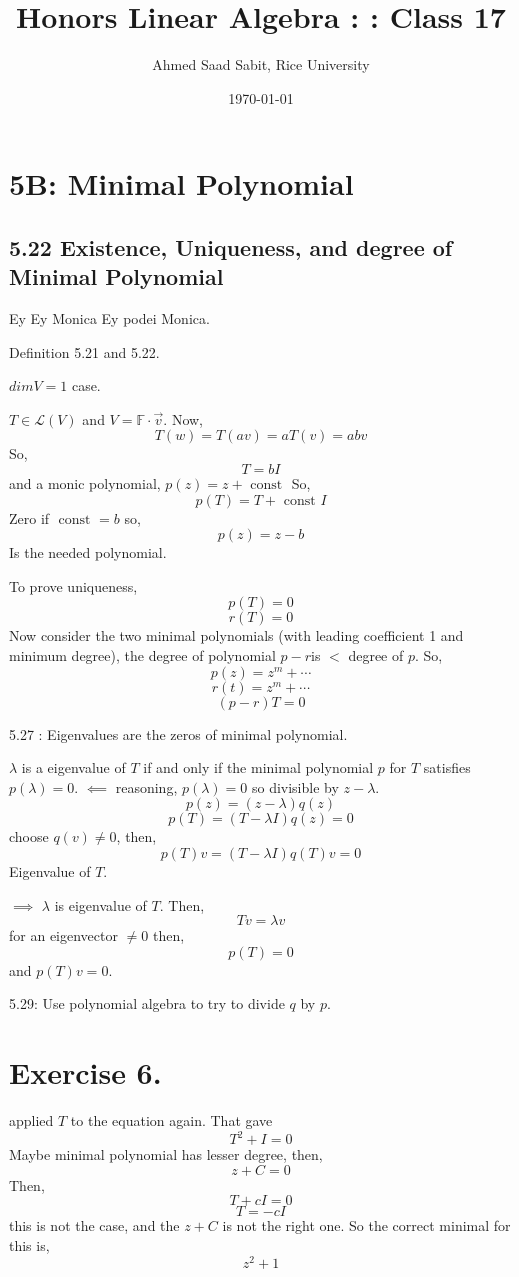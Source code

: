 \documentclass[letter]{article}
\title{Honors Linear Algebra : : Class 17}
\author{Ahmed Saad Sabit, Rice University}
\date{\today}
\begin{document}
\maketitle

\section*{5B: Minimal Polynomial} 
\subsection*{5.22 Existence, Uniqueness, and degree of Minimal Polynomial}

Ey Ey Monica 
Ey podei Monica. 

Definition 5.21 and 5.22. 

$dim V = 1$ case. 

$T \in  \mathcal L (V)$ and $V = \mathbb{F} \cdot \vec{v}$. Now,
\[
T(w ) = T(a v) = a T(v) = ab v
\]
So, 
\[
T = b I 
\]
and a monic polynomial, 
$p(z) = z+ \text{ const }$
So, 
\[
p(T) = T + \text{ const } I 
\]
Zero if $\text{ const } = b$
so, 
\[
p(z) = z - b
\] Is the needed polynomial. 

To prove uniqueness, 
\[
p(T) = 0
\]
\[
r(T) = 0
\]
Now consider the two minimal polynomials (with leading coefficient 1 and minimum degree), the degree of polynomial $p -r $is $< $ degree of $p$. So, 
\[
p(z) = z^{m} + \cdots
\]
\[
r(t) = z^{m} + \cdots
\]
\[
	(p-r) T = 0
\] 

5.27 : Eigenvalues are the zeros of minimal polynomial. 

$\lambda$ is a eigenvalue of $T$ if and only if the minimal polynomial $p$ for $T$ satisfies $p(\lambda) = 0$. 
$\impliedby$ reasoning, $p(\lambda) = 0$ so divisible by $z - \lambda$. \[
p(z) = (z-\lambda) q(z)
\]
\[
p(T) = (T - \lambda I) q(z) = 0 
\]
choose $q(v) \neq  0$, then,
 \[
p(T) v = (T - \lambda I) q(T) v = 0
\]
Eigenvalue of $T$. 


$\implies$ $\lambda$ is eigenvalue of $T$. Then, \[
T v = \lambda v
\] for an eigenvector $\neq  0$ then, 
\[
p(T) = 0
\]  and $p(T) v = 0$. 

5.29: Use polynomial algebra to try to divide $q$ by $p$. 

\section*{Exercise 6. }

applied $T$ to the equation again. That gave
\[
T^2 + I = 0
\] 
Maybe minimal polynomial has lesser degree, then, 
\[
z + C = 0
\] 
Then, 
\[
T + cI = 0
\]
\[
T = - cI 
\]
this is not the case, and the $z+C$ is not the right one. So the correct minimal for this is,
\[
z^2 + 1 
\]
\end{document}
